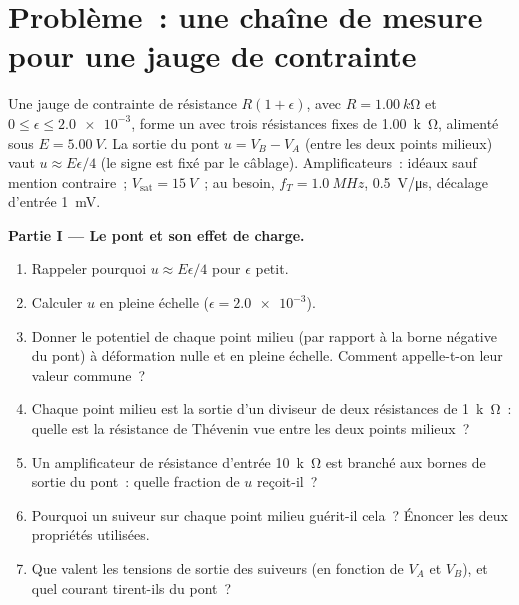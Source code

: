 \section{Problème~: une chaîne de mesure pour une jauge de contrainte}

\begin{problem}
\label{pb:b1:operational-amplifier:1}
Une jauge de contrainte de résistance $R(1 + \epsilon)$, avec
$R = \qty{1.00}{k\ohm}$ et $0 \leq \epsilon \leq \num{2.0e-3}$, forme un
 avec trois résistances fixes de \qty{1.00}{k\ohm},
alimenté sous $E = \qty{5.00}{V}$. La sortie du pont
$u = V_B - V_A$ (entre les deux points milieux) vaut
$u \approx E\epsilon/4$ (le signe est fixé par le câblage).
Amplificateurs~: idéaux sauf mention contraire~; $V_{\mathrm{sat}} = \qty{15}{V}$~;
au besoin, $f_T = \qty{1.0}{MHz}$,  \qty{0.5}{V/\micro s},
décalage d'entrée \qty{1}{mV}.

\medskip
\noindent\textbf{Partie I --- Le pont et son effet de charge.}
\begin{enumerate}
  \item Rappeler pourquoi $u \approx E\epsilon/4$ pour $\epsilon$ petit.
  \item Calculer $u$ en pleine échelle ($\epsilon = \num{2.0e-3}$).
  \item Donner le potentiel de chaque point milieu (par rapport à la
        borne négative du pont) à déformation nulle et en pleine
        échelle. Comment appelle-t-on leur valeur commune~?
  \item Chaque point milieu est la sortie d'un diviseur de deux
        résistances de \qty{1}{k\ohm}~: quelle est la résistance de
        Thévenin vue entre les deux points milieux~?
  \item Un amplificateur de résistance d'entrée \qty{10}{k\ohm} est
        branché aux bornes de sortie du pont~: quelle fraction de $u$
        reçoit-il~?
  \item Pourquoi un suiveur sur chaque point milieu guérit-il cela~?
        Énoncer les deux propriétés utilisées.
  \item Que valent les tensions de sortie des suiveurs (en fonction de
        $V_A$ et $V_B$), et quel courant tirent-ils du pont~?
\end{enumerate}


\end{problem}
